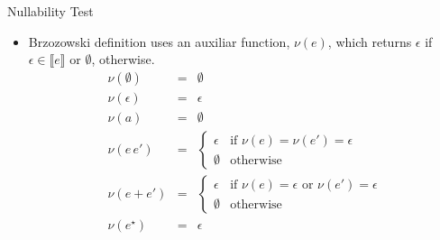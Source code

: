 \documentclass[14pt]{beamer}
\newcommand{\sembrack}[1]{\ensuremath{\llbracket #1 \rrbracket}}
\begin{document}
     \begin{frame}{Nullability Test}
        \begin{itemize}
           \item Brzozowski definition uses an auxiliar function, $\nu(e)$,
                 which returns $\epsilon$ if $\epsilon\in\sembrack{e}$ or
                 $\emptyset$, otherwise.
                 \[
                     \begin{array}{lcl}
                          \nu(\emptyset) & = & \emptyset \\
                          \nu(\epsilon)    & = & \epsilon \\
                          \nu(a)                & = & \emptyset \\
                          \nu(e\,e')           & = & \left\{
                                                                  \begin{array}{ll}
                                                                       \epsilon &
                                                                                  \text{if
                                                                                  }\nu(e)
                                                                                  =
                                                                                  \nu(e')
                                                                                  =
                                                                                  \epsilon
                                                                    \\
                                                                    \emptyset &
                                                                                \text{otherwise}
                                                                  \end{array}
                                                              \right. \\
                          \nu(e + e')  & = & \left\{
                                                          \begin{array}{ll}
                                                               \epsilon & \text{if
                                                                          }\nu(e) =
                                                                          \epsilon
                                                                          \text{ or
                                                                          }\nu(e') =
                                                                          \epsilon \\
                                                               \emptyset & \text{otherwise}
                                                          \end{array}
                                                       \right. \\
                          \nu(e^\star) & = & \epsilon
                     \end{array}
                 \]
        \end{itemize}
     \end{frame}
\end{document}
